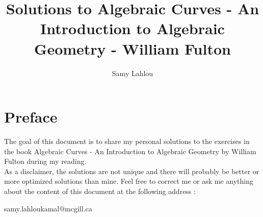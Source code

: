 \documentclass[12pt, oneside]{book}
\title{Solutions to Algebraic Curves - An Introduction to Algebraic Geometry - William Fulton}
\author{Samy Lahlou}
\newcounter{exercise}[chapter] %
\begin{document}
\maketitle

\chapter*{Preface}

The goal of this document is to share my personal solutions to the exercises
in the book Algebraic Curves - An Introduction to Algebraic Geometry by William Fulton during my reading. \\
As a disclaimer, the solutions are not unique and there will probably be better or more optimized solutions than mine. Feel free to correct me or ask me anything about the content of this document at the 
following address :

\noindent samy.lahloukamal@mcgill.ca

\tableofcontents


\end{document}
